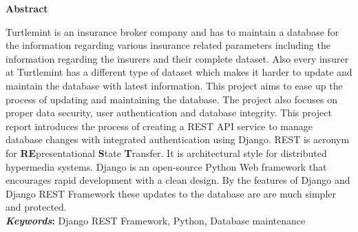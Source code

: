 \thispagestyle{empty} 
\vspace{1.0in}
\centerline{\Large{\bf Abstract}}
\vspace{.77cm}

\noindent
Turtlemint is an insurance broker company and has to maintain a database for
the information regarding various insurance related parameters including the
information regarding the insurers and their complete dataset. Also every
insurer at Turtlemint has a different type of dataset which makes it harder to
update and maintain the database with latest information. This project aims to
ease up the process of updating and maintaining the database. The project also
focuses on proper data security, user authentication and database integrity.
This project report introduces the process of creating a REST API
service to manage database changes with integrated authentication using Django.
REST is acronym for {\bf{RE}}presentational {\bf{S}}tate {\bf{T}}ransfer.
It is architectural style for distributed hypermedia systems. Django is an
open-source Python Web framework that encourages rapid development with a clean
design. By the features of Django and Django REST Framework these updates to
the database are are much simpler and protected.\\
\textbf{\textit{Keywords}:} Django REST Framework, Python, Database maintenance
